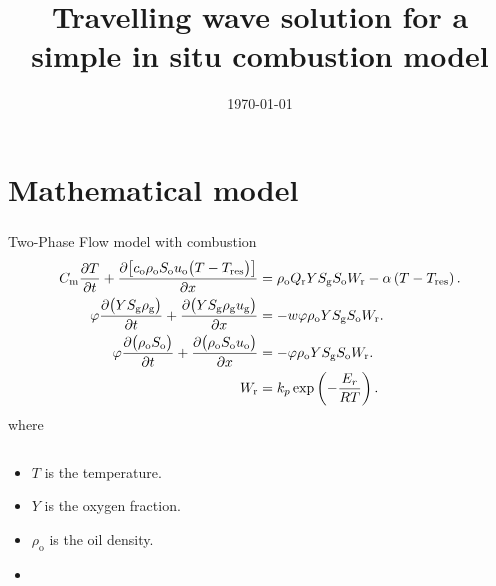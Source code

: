 \documentclass[
    8pt,
    aspectratio=1610,
    c,
    intlimits,
    leqno,
    professionalfonts,
]{beamer}
\title{Travelling wave solution for a simple in situ combustion model}
\subtitle{}
\author{}
\institute{}
\date{\today}
\begin{document}
\begin{frame}
	\titlepage
\end{frame}

\section{Mathematical model}

\begin{frame}
	\frametitle{\secname}

	\begin{block}{Two-Phase Flow model with combustion~\cite{Gargar2020}}
		\begin{align}
			C_{\text{m}}
			\diffp{T}{t}+
			\diffp{
				\big[
					c_{\text{o}}
					\rho_{\text{o}}
					S_{\text{o}}
					u_{\text{o}}
					\big(
					T-T_{\text{res}}
					\big)
					\big]
			}{x}                                                          & =
			\rho_{\text{o}}
			Q_{\text{r}}
			Y
			S_{\text{g}}
			S_{\text{o}}
			W_{\text{r}}-
			\alpha
			\left(T-T_{\text{res}}\right).                                    \\
			\varphi
			\diffp{\big(YS_{\text{g}}\rho_{\text{g}}\big)}{t}+
			\diffp{\big(YS_{\text{g}}\rho_{\text{g}}u_{\text{g}}\big)}{x} & =
			-w\varphi\rho_{\text{o}}YS_{\text{g}}S_{\text{o}}W_{\text{r}}.    \\
			\varphi
			\diffp{\big(\rho_{\text{o}}S_{\text{o}}\big)}{t}+
			\diffp{\big(\rho_{\text{o}}S_{\text{o}}u_{\text{o}}\big)}{x}
			                                                              & =
			-\varphi\rho_{\text{o}}YS_{\text{g}}S_{\text{o}}W_{\text{r}}.     \\
			W_{\text{r}}                                                  & =
			k_{p}
			\exp
			\left(
			-\frac{E_{r}}{RT}
			\right).
		\end{align}
		where
		\begin{columns}
			\begin{column}{.3\paperwidth}
				\begin{itemize}
					\item

					      $T$ is the temperature.

					\item

					      $Y$ is the oxygen fraction.

					\item

					      $\rho_{\text{o}}$ is the oil density.

					\item


\end{itemize}
\end{column}
\end{columns}
\end{block}
\end{frame}
\end{document}

